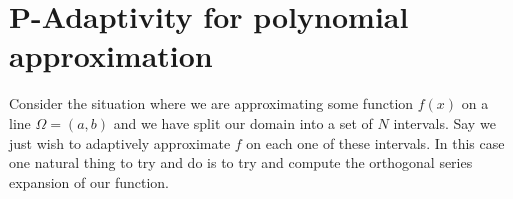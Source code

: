 \documentclass[10]{amsart}
\begin{document}
% 
% 
% 
% 
\section{P-Adaptivity for polynomial approximation}
Consider the situation where we are approximating
some function $f(x)$ on a line $\Omega=(a,b)$ and we have split our domain into a set of $N$ intervals. Say we just wish
to adaptively approximate $f$ on each one of these intervals. In this case one natural thing to try and do is to try and
compute the orthogonal series expansion of our function. 
\end{document}
